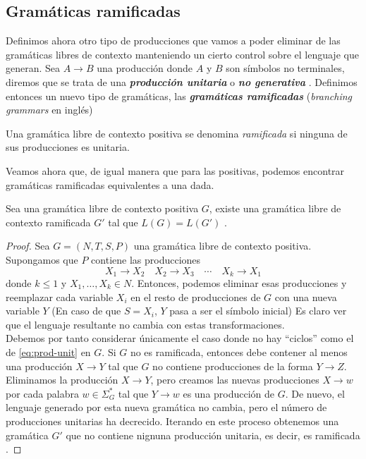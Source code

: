 \subsection{Gramáticas ramificadas}

Definimos ahora otro tipo de producciones que vamos a poder eliminar de las gramáticas libres de contexto manteniendo
un cierto control sobre el lenguaje que generan. Sea $A\to B$ una producción donde $A$ y $B$ son símbolos no 
terminales, diremos que se trata de una \textbf{\textit{producción unitaria}} o \textbf{\textit{no generativa}}
\cite{kelley_2001}. Definimos entonces un nuevo tipo de gramáticas, las \textbf{\textit{gramáticas ramificadas}}
(\textit{branching grammars} en inglés)

\begin{definicion}Una gramática libre de contexto positiva se denomina \textit{ramificada} si
ninguna de sus producciones es unitaria.    
\end{definicion}

Veamos ahora que, de igual manera que para las positivas, podemos encontrar gramáticas ramificadas equivalentes a una
dada.

\begin{lema}\label{lem:prod-unit}Sea una gramática libre de contexto positiva $G$, existe una gramática libre de 
contexto ramificada $G'$ tal que $L(G)=L(G')$ \cite{davis_sigal_weyuker_1994}.
\end{lema}
\begin{proof}
Sea $G=(N,T,S,P)$ una gramática libre de contexto positiva. Supongamos que $P$ contiene las producciones
\begin{equation}\label{eq:prod-unit}
    X_1\to X_2\quad X_2\to X_3\quad \cdots \quad X_k\to X_1
\end{equation}
donde $k\leq 1$ y $X_1,\dots,X_k\in N$. Entonces, podemos eliminar esas producciones y reemplazar cada variable $X_i$
en el resto de producciones de $G$ con una nueva variable $Y$ (En caso de que $S=X_i$, $Y$ pasa a ser el símbolo 
inicial) Es claro ver que el lenguaje resultante no cambia con estas transformaciones.\\
Debemos por tanto considerar únicamente el caso donde no hay ``ciclos'' como el de \eqref{eq:prod-unit} en $G$. Si
$G$ no es ramificada, entonces debe contener al menos una producción $X\to Y$ tal que $G$ no contiene producciones de
la forma $Y\to Z$. Eliminamos la producción $X\to Y$, pero creamos las nuevas producciones $X\to w$ por cada palabra
$w\in\Sigma_G^*$ tal que $Y\to w$ es una producción de $G$. De nuevo, el lenguaje generado por esta nueva gramática no
cambia, pero el número de producciones unitarias ha decrecido. Iterando en este proceso obtenemos una gramática $G'$
que no contiene nignuna producción unitaria, es decir, es ramificada \cite{davis_sigal_weyuker_1994}.
\end{proof}

